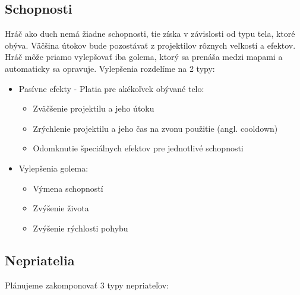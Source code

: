 \subsection{Schopnosti}

Hráč ako duch nemá žiadne schopnosti, tie získa v závislosti od typu tela, ktoré obýva. Väčšina útokov bude pozostávať z projektilov rôznych veľkostí a efektov. Hráč môže priamo vylepšovať iba golema, ktorý sa prenáša medzi mapami a automaticky sa opravuje. Vylepšenia rozdelíme na 2 typy:

\begin{itemize}
    \item Pasívne efekty - Platia pre akékoľvek obývané telo:
    \begin{itemize}
        \item Zväčšenie projektilu a jeho útoku
        \item Zrýchlenie projektilu a jeho čas na zvonu použitie (angl. cooldown)
        \item Odomknutie špeciálnych efektov pre jednotlivé schopnosti
    \end{itemize}
    \item Vylepšenia golema:
    \begin{itemize}
        \item Výmena schopností
        \item Zvýšenie života
        \item Zvýšenie rýchlosti pohybu
    \end{itemize}
\end{itemize}

\subsection{Nepriatelia}

Plánujeme zakomponovať 3 typy nepriateľov:

